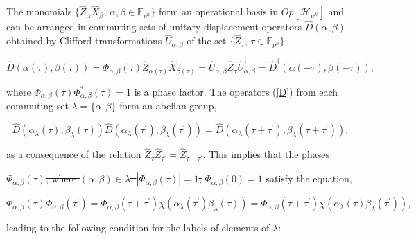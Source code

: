 \documentclass[quantumrep,article,submit,pdftex,moreauthors]{Definitions/mdpi}
\providecommand{\DIFadd}[1]{{\protect\color{blue}\uwave{#1}}} %
\providecommand{\DIFdel}[1]{{\protect\color{red}\sout{#1}}}                      %
\providecommand{\DIFaddbegin}{} %
\providecommand{\DIFaddend}{} %
\providecommand{\DIFdelbegin}{} %
\providecommand{\DIFdelend}{} %
\begin{document}
The monomials $\{\hat{Z}_{\alpha}\hat{X}_{\beta}$, $\alpha,\beta \in
\mathbb{F}_{p^{n}}\}$ form an operational basis in $Op[\mathcal{H}_{p^{N}}]$
and
 can be arranged in commuting sets of unitary displacement operators
$\hat{D}(\alpha,\beta)$ obtained by Clifford transformations
$\hat{U}_{\alpha,\beta}$ of the set $\{\hat{Z}_{\tau}$, $\tau \in
\mathbb{F}_{p^{n}}\}$:

\begin{equation}
  \hat{D} \left( \alpha(\tau),\beta(\tau) \right)
  = \Phi_{\alpha,\beta} \left( \tau \right)
  \hat{Z}_{\alpha(\tau)}\hat{X}_{\beta(\tau)}
  = \hat{U}_{\alpha,\beta}\hat{Z}_{\tau}\hat{U}_{\alpha,\beta }^{\dagger}
  = \hat{D}^{\dagger} \left(\alpha(-\tau),\beta(-\tau)\right),
  \label{D}
\end{equation}

where $\Phi_{\alpha,\beta}\left( \tau \right) \Phi_{\alpha,\beta}^{\ast}\left(
\tau \right)=1$ is a phase factor. The operators (\ref{D}) from each commuting
set $\lambda=\{\alpha,\beta\}$ form an abelian group,

\begin{equation}
  \hat{D}\left( \alpha_{\lambda}(\tau),\beta_{\lambda }(\tau) \right)
  \hat{D}\left(
    \alpha_{\lambda}(\tau^{\prime}),\beta_{\lambda}(\tau^{\prime})
  \right)
  = \hat{D}\left(
    \alpha_{\lambda}(\tau + \tau^{\prime}),
    \beta_{\lambda}(\tau + \tau^{\prime} )
  \right),
  \label{DD}
\end{equation}

as a consequence of the relation $\hat{Z}_{\tau}\hat{Z}_{\tau^{\prime}} =
\hat{Z}_{\tau+\tau^{\prime}}$. This implies that the phases
 \DIFdelbegin
\DIFdel{$\Phi _{\alpha,\beta }\left( \tau \right) $, where $(\alpha ,\beta )\in
\lambda $,
 $|\Phi _{\alpha ,\beta }\left( \tau \right) |=1$, }\DIFdelend
\DIFaddbegin \DIFadd{$\Phi_{\alpha,\beta}\left( \tau \right)$, where
$(\alpha,\beta )\in \lambda$,
 }\DIFaddend $\Phi_{\alpha,\beta}\left(0\right) =
1$ satisfy the equation,

\begin{equation}
  \Phi_{\alpha,\beta} \left( \tau \right)
  \Phi_{\alpha,\beta }\left(\tau^{\prime}\right)
  = \Phi_{\alpha,\beta}\left( \tau+\tau^{\prime}\right)
  \chi\left( \alpha_{\lambda}(\tau^{\prime})\beta_{\lambda}(\tau) \right)
  = \Phi_{\alpha,\beta}\left(\tau+\tau^{\prime}\right)
  \chi\left(\alpha_{\lambda}(\tau)\beta_{\lambda}(\tau^{\prime })\right),
  \label{Phi}
\end{equation}

leading to the following condition for the labels of elements of $\lambda$:
\end{document}
